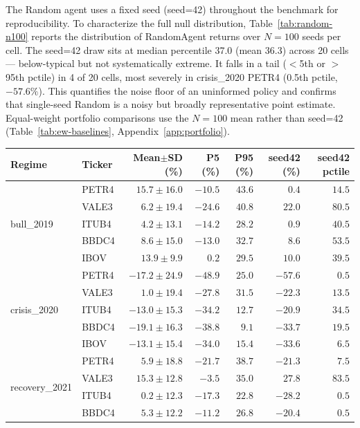 \documentclass{article}
\begin{document}
The Random agent uses a fixed seed (seed=42) throughout the benchmark
for reproducibility. To characterize the full null distribution,
Table~\ref{tab:random-n100} reports the distribution of RandomAgent
returns over $N{=}100$ seeds per cell. The seed=42 draw sits at
median percentile 37.0 (mean 36.3) across 20 cells --- below-typical
but not systematically extreme. It falls in a tail ($<$5th or $>$95th
pctile) in 4 of 20 cells, most severely in crisis\_2020 PETR4 (0.5th
pctile, $-57.6\%$). This quantifies the noise floor of an uninformed
policy and confirms that single-seed Random is a noisy but broadly
representative point estimate. Equal-weight portfolio comparisons use
the $N{=}100$ mean rather than seed=42 (Table~\ref{tab:ew-baselines},
Appendix~\ref{app:portfolio}).

\begin{table}[t]
\centering
\small
\begin{tabular}{llrrrrr}
\toprule
Regime & Ticker & Mean$\pm$SD (\%) & P5 (\%) & P95 (\%) & seed42 (\%) & seed42 pctile \\
\midrule
\multirow{5}{*}{bull\_2019} & PETR4 & $15.7\pm16.0$ & $-10.5$ & $43.6$ & $0.4$ & $14.5$ \\
 & VALE3 & $6.2\pm19.4$ & $-24.6$ & $40.8$ & $22.0$ & $80.5$ \\
 & ITUB4 & $4.2\pm13.1$ & $-14.2$ & $28.2$ & $0.9$ & $40.5$ \\
 & BBDC4 & $8.6\pm15.0$ & $-13.0$ & $32.7$ & $8.6$ & $53.5$ \\
 & IBOV  & $13.9\pm9.9$  & $0.2$   & $29.5$ & $10.0$ & $39.5$ \\
\midrule
\multirow{5}{*}{crisis\_2020} & PETR4 & $-17.2\pm24.9$ & $-48.9$ & $25.0$ & $-57.6$ & $0.5$ \\
 & VALE3 & $1.0\pm19.4$   & $-27.8$ & $31.5$ & $-22.3$ & $13.5$ \\
 & ITUB4 & $-13.0\pm15.3$ & $-34.2$ & $12.7$ & $-20.9$ & $34.5$ \\
 & BBDC4 & $-19.1\pm16.3$ & $-38.8$ & $9.1$  & $-33.7$ & $19.5$ \\
 & IBOV  & $-13.1\pm15.4$ & $-34.0$ & $15.4$ & $-33.6$ & $6.5$ \\
\midrule
\multirow{5}{*}{recovery\_2021} & PETR4 & $5.9\pm18.8$  & $-21.7$ & $38.7$ & $-21.3$ & $7.5$ \\
 & VALE3 & $15.3\pm12.8$ & $-3.5$  & $35.0$ & $27.8$  & $83.5$ \\
 & ITUB4 & $0.2\pm12.3$  & $-17.3$ & $22.8$ & $-28.2$ & $0.5$ \\
 & BBDC4 & $5.3\pm12.2$  & $-11.2$ & $26.8$ & $-20.4$ & $0.5$ \\

\end{tabular}
\end{table}
\end{document}
